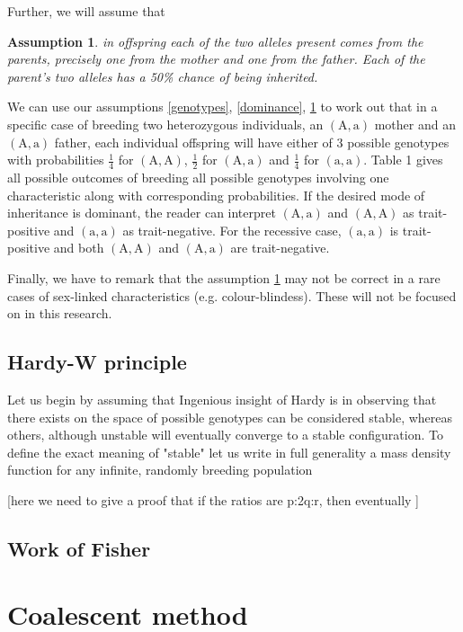 \documentclass{l4proj}
\newtheorem{assum}{Assumption}
\newcommand{\genotype}[2]{\ensuremath{(\mathrm{#1}, \mathrm{#2})}}
\begin{document}
Further, we will assume that
\begin{assum}\label{offspring}
  in offspring each of the two alleles present comes from the parents, precisely one from the mother and one from the father. Each of the parent's two alleles has a 50\% chance of being inherited.
\end{assum}
We can use our assumptions \ref{genotypes}, \ref{dominance}, \ref{offspring} to work out that in a specific case of breeding two heterozygous individuals, an \genotype{A}{a} mother and an \genotype{A}{a} father, each individual offspring will have either of 3 possible genotypes with probabilities $\frac{1}{4}$ for \genotype{A}{A}, $\frac{1}{2}$ for \genotype{A}{a} and $\frac{1}{4}$ for \genotype{a}{a}. Table 1 gives all possible outcomes of breeding all possible genotypes involving one characteristic along with corresponding probabilities. If the desired mode of inheritance is dominant, the reader can interpret \genotype{A}{a} and \genotype{A}{A} as trait-positive and \genotype{a}{a} as trait-negative. For the recessive case, \genotype{a}{a} is trait-positive and both \genotype{A}{A} and \genotype{A}{a} are trait-negative.

Finally, we have to remark that the assumption \ref{offspring} may not be correct in a rare cases of sex-linked characteristics (e.g. colour-blindess). These will not be focused on in this research.

\subsection{Hardy-W principle}

Let us begin by assuming that
Ingenious insight of Hardy is in observing that there exists on the space of possible genotypes can be considered stable, whereas others, although unstable will eventually converge to a stable configuration. To define the exact meaning of "stable" let us write in full generality a mass density function for any infinite, randomly breeding population

[here we need to give a proof that if the ratios are p:2q:r, then eventually ]
 
\subsection{Work of Fisher}

\section{Coalescent method}
\end{document}
